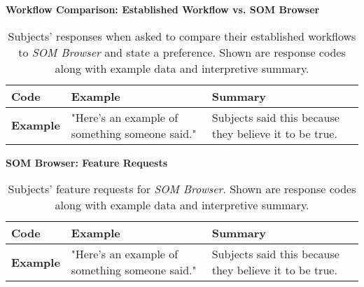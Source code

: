 \begin{table}[!ht]
  \textbf{Workflow Comparison: Established Workflow vs. SOM Browser}
  \renewcommand{\arraystretch}{1.2}
  \centering
  \footnotesize
  \begin{tabular}{ p{4.0cm} p{4.75cm} p{4.75cm} }
  \hline
    \textbf{Code} & \textbf{Example} & \textbf{Summary} \\
    \hline
    \textbf{Example}
    &
    "Here's an example of something someone said."
    &
    Subjects said this because they believe it to be true.
    \\
  \end{tabular}
  \caption[Workflow Comparison Established Workflow vs. \textit{SOM Browser}]
  {Subjects' responses when asked to compare their established workflows to
  \textit{SOM Browser} and state a preference. Shown are response codes along
  with example data and interpretive summary.}
  \label{table:responses_workflow_comparison}
\end{table}

\begin{table}[!ht]
  \textbf{SOM Browser: Feature Requests}
  \renewcommand{\arraystretch}{1.2}
  \centering
  \footnotesize
  \begin{tabular}{ p{4.0cm} p{4.75cm} p{4.75cm} }
  \hline
    \textbf{Code} & \textbf{Example} & \textbf{Summary} \\
    \hline
    \textbf{Example}
    &
    "Here's an example of something someone said."
    &
    Subjects said this because they believe it to be true.
    \\
  \end{tabular}
  \caption[SOM Browser: Feature Requests]{Subjects' feature requests for
  \textit{SOM Browser}. Shown are response codes along with example data and
  interpretive summary.}
  \label{table:responses_feature_requests}
\end{table}

